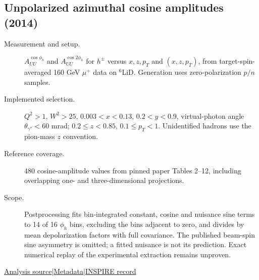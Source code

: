 \documentclass[11pt,a4paper]{article}
\newcommand{\id}[1]{{\small\texttt{\detokenize{#1}}}}
\begin{document}
\subsection{\texorpdfstring{Unpolarized azimuthal cosine amplitudes (2014)}{Unpolarized azimuthal cosine amplitudes (2014)}}
\id{COMPASS_2014_I1278730}\quad\cite{r1278730}
\begin{description}
\item[Measurement and setup.] $A_{UU}^{\cos\phi_h}$ and $A_{UU}^{\cos2\phi_h}$ for $h^\pm$ versus $x,z,p_T$ and $(x,z,p_T)$, from target-spin-averaged 160 GeV $\mu^+$ data on $^6$LiD. Generation uses zero-polarization $p/n$ samples.
\item[Implemented selection.] $Q^2>1$, $W^2>25$, $0.003<x<0.13$, $0.2<y<0.9$, virtual-photon angle $\theta_{\gamma^*}<60$ mrad; $0.2\le z<0.85$, $0.1\le p_T<1$. Unidentified hadrons use the pion-mass $z$ convention.
\item[Reference coverage.] 480 cosine-amplitude values from pinned paper Tables 2--12, including overlapping one- and three-dimensional projections.
\item[Scope.] Postprocessing fits bin-integrated constant, cosine and nuisance sine terms to 14 of 16 $\phi_h$ bins, excluding the bins adjacent to zero, and divides by mean depolarization factors with full covariance. The published beam-spin sine asymmetry is omitted; a fitted nuisance is not its prediction. Exact numerical replay of the experimental extraction remains unproven.
\end{description}
{\small\href{https://github.com/apapaefs/HerwigPolarizedPheno/blob/105045bd757aaa6b217e87811dc5f9a22a8d1cef/analyses/rivet/dis/COMPASS_2014_I1278730.cc}{Analysis source}\quad|\quad\href{https://github.com/apapaefs/HerwigPolarizedPheno/blob/105045bd757aaa6b217e87811dc5f9a22a8d1cef/analyses/rivet/dis/COMPASS_2014_I1278730.info}{Metadata}\quad|\quad\href{https://inspirehep.net/literature/1278730}{INSPIRE record}}
\end{document}
